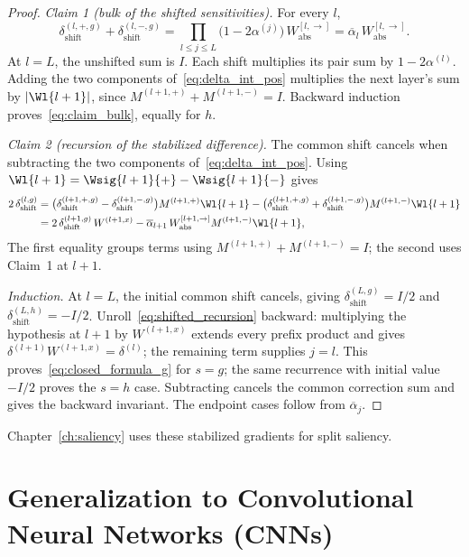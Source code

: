 \begin{proof}
\emph{Claim 1 (bulk of the shifted sensitivities).} For every $l$,
\begin{equation}
	\delta_{\mathrm{shift}}^{(l,+,g)} + \delta_{\mathrm{shift}}^{(l,-,g)} = \prod_{l \le j \le L} \bigl( 1 - 2\alpha^{(j)} \bigr)\, W_{\mathrm{abs}}^{[l, \rightarrow]} = \overline{\alpha}_l\, W_{\mathrm{abs}}^{[l, \rightarrow]}.
	\label{eq:claim_bulk}
\end{equation}
At $l=L$, the unshifted sum is $I$. Each shift multiplies its pair sum by $1-2\alpha^{(l)}$. Adding the two components of~\eqref{eq:delta_int_pos} multiplies the next layer's sum by $|\Wl{l+1}|$, since $M^{(l+1,+)}+M^{(l+1,-)}=I$. Backward induction proves~\eqref{eq:claim_bulk}, equally for $h$.

\emph{Claim 2 (recursion of the stabilized difference).} The common shift cancels when subtracting the two components of~\eqref{eq:delta_int_pos}. Using $\Wl{l+1}=\Wsig{l+1}{+}-\Wsig{l+1}{-}$ gives
\begin{align}
	2\, \delta_{\mathrm{shift}}^{(l,g)}
	&= \bigl( \delta_{\mathrm{shift}}^{(l+1,+,g)} - \delta_{\mathrm{shift}}^{(l+1,-,g)} \bigr) M^{(l+1,+)} \Wl{l+1}
	- \bigl( \delta_{\mathrm{shift}}^{(l+1,+,g)} + \delta_{\mathrm{shift}}^{(l+1,-,g)} \bigr) M^{(l+1,-)} \Wl{l+1} \notag\\
	&= 2\, \delta_{\mathrm{shift}}^{(l+1,g)}\, W^{(l+1,x)} - \overline{\alpha}_{l+1}\, W_{\mathrm{abs}}^{[l+1, \rightarrow]} M^{(l+1,-)} \Wl{l+1},
	\label{eq:shifted_recursion}
\end{align}
The first equality groups terms using $M^{(l+1,+)} + M^{(l+1,-)} = I$; the second uses Claim~1 at $l+1$.

\emph{Induction.} At $l=L$, the initial common shift cancels, giving $\delta_{\mathrm{shift}}^{(L,g)}=I/2$ and $\delta_{\mathrm{shift}}^{(L,h)}=-I/2$. Unroll~\eqref{eq:shifted_recursion} backward: multiplying the hypothesis at $l+1$ by $W^{(l+1,x)}$ extends every prefix product and gives $\delta^{(l+1)}W^{(l+1,x)}=\delta^{(l)}$; the remaining term supplies $j=l$. This proves~\eqref{eq:closed_formula_g} for $s=g$; the same recurrence with initial value $-I/2$ proves the $s=h$ case. Subtracting cancels the common correction sum and gives the backward invariant. The endpoint cases follow from $\overline{\alpha}_j$.
\end{proof}
Chapter~\ref{ch:saliency} uses these stabilized gradients for split saliency.

\section{Generalization to Convolutional Neural Networks (CNNs)}\label{sec:cnn_decompositions}

